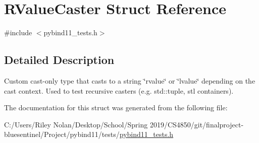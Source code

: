 \hypertarget{struct_r_value_caster}{}\section{R\+Value\+Caster Struct Reference}
\label{struct_r_value_caster}


{\ttfamily \#include $<$pybind11\+\_\+tests.\+h$>$}



\subsection{Detailed Description}
Custom cast-\/only type that casts to a string \char`\"{}rvalue\char`\"{} or \char`\"{}lvalue\char`\"{} depending on the cast context. Used to test recursive casters (e.\+g. std\+::tuple, stl containers). 

The documentation for this struct was generated from the following file\+:\begin{DoxyCompactItemize}
\item 
C\+:/\+Users/\+Riley Nolan/\+Desktop/\+School/\+Spring 2019/\+C\+S4850/git/finalproject-\/bluesentinel/\+Project/pybind11/tests/\mbox{\hyperlink{pybind11__tests_8h}{pybind11\+\_\+tests.\+h}}\end{DoxyCompactItemize}
